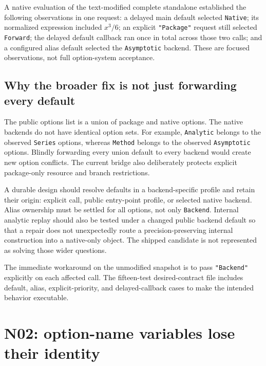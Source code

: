 \documentclass[11pt]{article}
\newcommand{\code}[1]{\texttt{#1}}
\begin{document}
A native evaluation of the text-modified complete standalone established the following observations in one request: a delayed main default selected \code{Native}; its normalized expression included $x^3/6$; an explicit \code{"Package"} request still selected \code{Forward}; the delayed default callback ran once in total across those two calls; and a configured alias default selected the \code{Asymptotic} backend. These are focused observations, not full option-system acceptance.

\subsection{Why the broader fix is not just forwarding every default}
The public options list is a union of package and native options. The native backends do not have identical option sets. For example, \code{Analytic} belongs to the observed \code{Series} options, whereas \code{Method} belongs to the observed \code{Asymptotic} options. Blindly forwarding every union default to every backend would create new option conflicts. The current bridge also deliberately protects explicit package-only resource and branch restrictions.\cite{bridge,wlseries,wlasymptotic}

A durable design should resolve defaults in a backend-specific profile and retain their origin: explicit call, public entry-point profile, or selected native backend. Alias ownership must be settled for all options, not only \code{Backend}. Internal analytic replay should also be tested under a changed public backend default so that a repair does not unexpectedly route a precision-preserving internal construction into a native-only object. The shipped candidate is not represented as solving those wider questions.

The immediate workaround on the unmodified snapshot is to pass \code{"Backend"} explicitly on each affected call. The fifteen-test desired-contract file includes default, alias, explicit-priority, and delayed-callback cases to make the intended behavior executable.

\section{N02: option-name variables lose their identity}
\label{sec:n02}
\end{document}
